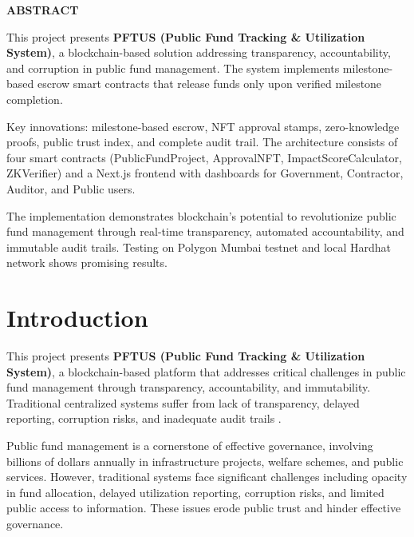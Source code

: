\documentclass[12pt,a4wide]{report}
\theoremstyle{plain}
\theoremstyle{definition}
\theoremstyle{remark}
\begin{document}
\clearpage

 \setcounter{page}{2}
\begin{center}
{\Large{\bf{ABSTRACT}}}
\end{center}

This project presents \textbf{PFTUS (Public Fund Tracking \& Utilization System)}, a blockchain-based solution addressing transparency, accountability, and corruption in public fund management. The system implements milestone-based escrow smart contracts that release funds only upon verified milestone completion.

Key innovations: milestone-based escrow, NFT approval stamps, zero-knowledge proofs, public trust index, and complete audit trail. The architecture consists of four smart contracts (PublicFundProject, ApprovalNFT, ImpactScoreCalculator, ZKVerifier) and a Next.js frontend with dashboards for Government, Contractor, Auditor, and Public users.

The implementation demonstrates blockchain's potential to revolutionize public fund management through real-time transparency, automated accountability, and immutable audit trails. Testing on Polygon Mumbai testnet and local Hardhat network shows promising results.

\clearpage

\tableofcontents
\clearpage
\listoffigures
\listoftables
\clearpage

\newpage

\setcounter{page}{1}


\chapter{Introduction}

This project presents \textbf{PFTUS (Public Fund Tracking \& Utilization System)}, a blockchain-based platform that addresses critical challenges in public fund management through transparency, accountability, and immutability. Traditional centralized systems suffer from lack of transparency, delayed reporting, corruption risks, and inadequate audit trails \cite{blockchain-gov}.

Public fund management is a cornerstone of effective governance, involving billions of dollars annually in infrastructure projects, welfare schemes, and public services. However, traditional systems face significant challenges including opacity in fund allocation, delayed utilization reporting, corruption risks, and limited public access to information. These issues erode public trust and hinder effective governance.
\end{document}
